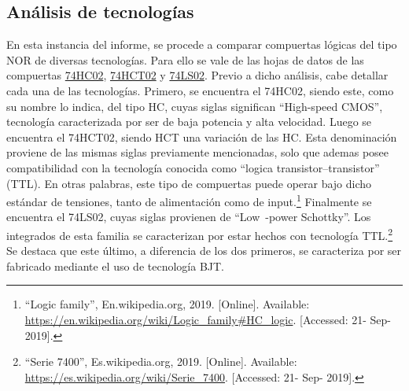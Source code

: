 \subsection{Análisis de tecnologías}

En esta instancia del informe, se procede a comparar compuertas lógicas del tipo NOR de diversas tecnologías. Para ello se vale de las hojas de datos de las compuertas \href{http://www.ti.com/lit/ds/symlink/sn74hc02.pdf}{74HC02}, \href{http://www.ti.com/lit/ds/symlink/sn74hct02.pdf}{74HCT02} y \href{http://www.ti.com/lit/ds/symlink/sn74ls02.pdf}{74LS02}. Previo a dicho análisis, cabe detallar cada una de las tecnologías. Primero, se encuentra el 74HC02, siendo este, como su nombre lo indica, del tipo HC, cuyas siglas significan ``High-speed CMOS'', tecnología caracterizada por ser de baja potencia y alta velocidad. Luego se encuentra el 74HCT02, siendo HCT una variación de las HC. Esta denominación proviene de las mismas siglas previamente mencionadas, solo que ademas posee compatibilidad con la tecnología conocida como ``logica transistor–transistor'' (TTL). En otras palabras, este tipo de compuertas puede operar bajo dicho estándar de tensiones, tanto de alimentación como de input.\footnote{``Logic family'', En.wikipedia.org, 2019. [Online]. Available: \url{https://en.wikipedia.org/wiki/Logic\_family\#HC\_logic}. [Accessed: 21- Sep- 2019].} Finalmente se encuentra el 74LS02, cuyas siglas provienen de ``Low~-power Schottky''. Los integrados de esta familia se caracterizan por estar hechos con tecnología TTL.\footnote{``Serie 7400'', Es.wikipedia.org, 2019. [Online]. Available: \url{https://es.wikipedia.org/wiki/Serie\_7400}. [Accessed: 21- Sep- 2019].} Se destaca que este último, a diferencia de los dos primeros, se caracteriza por ser fabricado mediante el uso de tecnología BJT.


